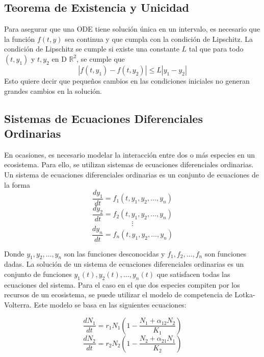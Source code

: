 \documentclass{article}
\begin{document}
\subsection{Teorema de Existencia y Unicidad}

Para asegurar que una ODE tiene solución única en un intervalo, es necesario que la función \(f(t, y)\) sea continua y que cumpla con la condición de Lipschitz. La condición de Lipschitz se cumple si existe una constante \(L\) tal que para todo \((t, y_1)\) y \(t, y_2\) en D \subset $\mathbb{R}^2$, se cumple que
\[
|f(t, y_1) - f(t, y_2)| \leq L|y_1 - y_2|
\]
Esto quiere decir que pequeños cambios en las condiciones iniciales no generan grandes cambios en la solución.

\subsection{Sistemas de Ecuaciones Diferenciales Ordinarias}

En ocasiones, es necesario modelar la interacción entre dos o más especies en un ecosistema. Para ello, se utilizan sistemas de ecuaciones diferenciales ordinarias. Un sistema de ecuaciones diferenciales ordinarias es un conjunto de ecuaciones de la forma
\[
\frac{dy_1}{dt} = f_1(t, y_1, y_2, \ldots, y_n)
\]
\[
\frac{dy_2}{dt} = f_2(t, y_1, y_2, \ldots, y_n)
\]
\[
\vdots
\]
\[
\frac{dy_n}{dt} = f_n(t, y_1, y_2, \ldots, y_n)
\]

Donde \(y_1, y_2, \ldots, y_n\) son las funciones desconocidas y \(f_1, f_2, \ldots, f_n\) son funciones dadas. La solución de un sistema de ecuaciones diferenciales ordinarias es un conjunto de funciones \(y_1(t), y_2(t), \ldots, y_n(t)\) que satisfacen todas las ecuaciones del sistema.
Para el caso en el que dos especies compiten por los recursos de un ecosistema, se puede utilizar el modelo de competencia de Lotka-Volterra. Este modelo se basa en las siguientes ecuaciones:

\begin{equation}
\frac {dN_1} {dt} = r_1N_1 \left(1 - \frac {N_1 + \alpha_{12}N_2} {K_1}\right) \label{eq:(1.3)}
\end{equation}
\begin{equation}
\frac {dN_2} {dt} = r_2N_2 \left(1 - \frac {N_2 + \alpha_{21}N_1} {K_2}\right) \label{eq:(1.4)}
\end{equation}
\end{document}
